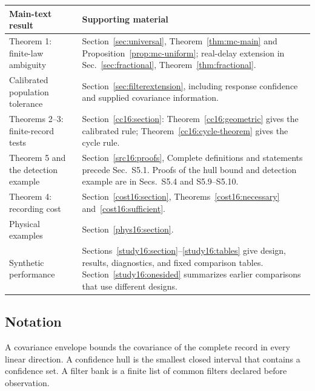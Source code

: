 \documentclass[11pt]{article}
\begin{document}
\begin{center}\small
\begin{tabular}{@{}p{}p{}@{}}\toprule
Main-text result & Supporting material \\\midrule
Theorem 1: finite-law ambiguity & Section~\ref{sec:universal}, Theorem~\ref{thm:mc-main} and Proposition~\ref{prop:mc-uniform}; real-delay extension in Sec.~\ref{sec:fractional}, Theorem~\ref{thm:fractional}. \\
Calibrated population tolerance & Section~\ref{sec:filterextension}, including response confidence and supplied covariance information. \\
Theorems 2--3: finite-record tests & Section~\ref{cc16:section}: Theorem~\ref{cc16:geometric} gives the calibrated rule; Theorem~\ref{cc16:cycle-theorem} gives the cycle rule. \\
Theorem 5 and the detection example & Section~\ref{src16:proofs}, Complete definitions and statements precede Sec.~S5.1. Proofs of the hull bound and detection example are in Secs.~S5.4 and S5.9--S5.10. \\
Theorem 4: recording cost & Section~\ref{cost16:section}, Theorems~\ref{cost16:necessary} and~\ref{cost16:sufficient}. \\
Physical examples & Section~\ref{phys16:section}. \\
Synthetic performance & Sections~\ref{study16:section}--\ref{study16:tables} give design, results, diagnostics, and fixed comparison tables. Section~\ref{study16:onesided} summarizes earlier comparisons that use different designs. \\\bottomrule
\end{tabular}
\end{center}

\subsection*{Notation}
A covariance envelope bounds the covariance of the complete record in every linear direction. A confidence hull is the smallest closed interval that contains a confidence set. A filter bank is a finite list of common filters declared before observation.
\end{document}
